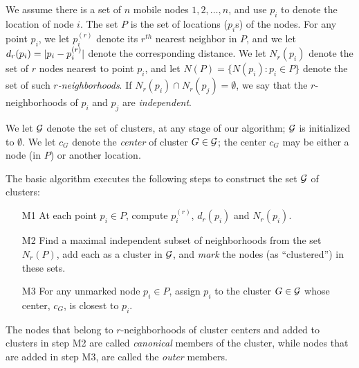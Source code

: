 We assume there is a set of $n$ mobile nodes $1,2,\dots , n$, and use $p_{i}$ to denote the location of node $i$. The set $P$ is the set of locations ($p_{i}$s) of the nodes. 
For any point $p_i$, we let $p_i^{(r)}$ denote its $r^{th}$ nearest neighbor in $P$, and we let $d_{r}(p_{i}) = \mathopen|p_{i} - p_{i}^{(r)}\mathclose|$ denote the corresponding distance. We let $N_{r}(p_{i})$ denote the set of $r$ nodes nearest to point $p_i$, and let $N(P)=\{N(p_{i}): p_{i}\in P\}$ denote the set of such {\em $r$-neighborhoods}. If $N_{r}(p_{i}) \cap N_{r}(p_{j})=\emptyset$, we say that the $r$-neighborhoods of $p_{i}$ and $p_{j}$ are {\em independent}.


We let $\mathcal{G}$ denote the set of clusters, at any stage of our algorithm; $\mathcal{G}$ is initialized to $\emptyset$. 
We let $c_G$ denote the {\em center} of cluster $G\in \mathcal{G}$; the center $c_G$ may be either a node (in $P$) or another location.

The basic algorithm executes the following steps to construct the set $\mathcal{G}$ of clusters:
\begin{enumerate}
\item[M1] At each point $p_{i}\in P$, compute $p_{i}^{(r)}$, $d_{r}(p_{i})$ and $N_{r}(p_{i})$.
\item[M2] Find a maximal independent subset of neighborhoods from the set $N_{r}(P)$, add each as a cluster in $\mathcal{G}$, and {\em mark} the nodes (as ``clustered'') in these sets.
\item[M3]  For any unmarked node $p_{i}\in P$, assign $p_{i}$ to the cluster $G\in\mathcal{G}$ whose center, $c_G$, is closest to $p_{i}$.
\end{enumerate}

The nodes that belong to $r$-neighborhoods of cluster centers and added to clusters in step M2 are called {\em canonical} members of the cluster, while nodes that are added in step M3, are called the {\em outer} members. 



